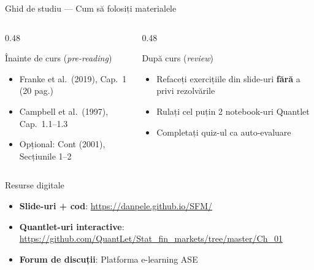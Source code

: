 \documentclass[9pt, aspectratio=169, t]{beamer}
\theoremstyle{definition}
\begin{document}
\begin{frame}{Ghid de studiu --- Cum să folosiți materialele}
\begin{columns}[T]
\begin{column}{0.48\textwidth}
\begin{block}{Înainte de curs (\textit{pre-reading})}
\begin{itemize}\setlength\itemsep{2pt}
\item Franke et al.\ (2019), Cap.\ 1 (20 pag.)
\item Campbell et al.\ (1997), Cap.\ 1.1--1.3
\item Opțional: Cont (2001), Secțiunile 1--2
\end{itemize}
\end{block}
\end{column}
\begin{column}{0.48\textwidth}
\begin{block}{După curs (\textit{review})}
\begin{itemize}\setlength\itemsep{2pt}
\item Refaceți exercițiile din slide-uri \textbf{fără} a privi rezolvările
\item Rulați cel puțin 2 notebook-uri Quantlet
\item Completați quiz-ul ca auto-evaluare
\end{itemize}
\end{block}
\end{column}
\end{columns}
\vspace{0.2cm}
\begin{alertblock}{Resurse digitale}
\begin{itemize}\setlength\itemsep{1pt}
\item \textbf{Slide-uri + cod}: \url{https://danpele.github.io/SFM/}
\item \textbf{Quantlet-uri interactive}: \url{https://github.com/QuantLet/Stat_fin_markets/tree/master/Ch_01}
\item \textbf{Forum de discuții}: Platforma e-learning ASE
\end{itemize}
\end{alertblock}
\end{frame}
\end{document}
